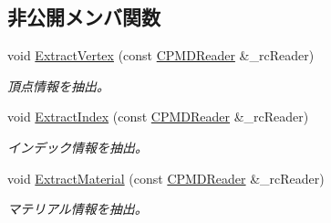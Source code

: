 \subsection*{非公開メンバ関数}
\begin{DoxyCompactItemize}
\item 
void \hyperlink{class_c_p_m_d_mesh_a3de096042308999ed7a2d37e66be76fc}{Extract\+Vertex} (const \hyperlink{class_c_p_m_d_reader}{C\+P\+M\+D\+Reader} \&\+\_\+rc\+Reader)
\begin{DoxyCompactList}\small\item\em 頂点情報を抽出。 \end{DoxyCompactList}\item 
void \hyperlink{class_c_p_m_d_mesh_a24efaf85ad9f3866a054d6a89b829612}{Extract\+Index} (const \hyperlink{class_c_p_m_d_reader}{C\+P\+M\+D\+Reader} \&\+\_\+rc\+Reader)
\begin{DoxyCompactList}\small\item\em インデック情報を抽出。 \end{DoxyCompactList}\item 
void \hyperlink{class_c_p_m_d_mesh_aeace2ace7326d12ee04f7549240c771e}{Extract\+Material} (const \hyperlink{class_c_p_m_d_reader}{C\+P\+M\+D\+Reader} \&\+\_\+rc\+Reader)
\begin{DoxyCompactList}\small\item\em マテリアル情報を抽出。 \end{DoxyCompactList}\end{DoxyCompactItemize}
